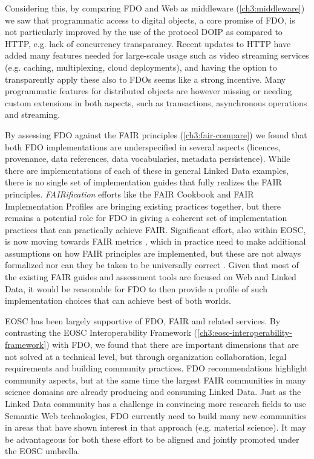 Considering this, by comparing FDO and Web as middleware (\vref*{ch3:middleware}) we saw that programmatic access to digital objects, a core promise of FDO, is not particularly improved by the use of the protocol DOIP as compared to HTTP, e.g. lack of concurrency transparancy. Recent updates to HTTP have added many features needed for large-scale usage such as video streaming services (e.g. caching, multiplexing, cloud deployments), and having the option to transparently apply these also to FDOs seems like a strong incentive. Many programmatic features for distributed objects are however missing or needing custom extensions in both aspects, such as transactions, asynchronous operations and streaming.

By assessing FDO against the FAIR principles (\vref*{ch3:fair-compare}) we found that both FDO implementations are underspecified in several aspects (licences, provenance, data references, data vocabularies, metadata persistence). While there are implementations of each of these in general Linked Data examples, there is no single set of implementation guides that fully realizes the FAIR principles. \emph{FAIRification} efforts like the FAIR Cookbook \cite{faircookbook} and FAIR Implementation Profiles \cite{FIP} are bringing existing practices together, but there remains a potential role for FDO in giving a coherent set of implementation practices that can practically achieve FAIR. Significant effort, also within EOSC, is now moving towards FAIR metrics \cite{Devaraju_2021}, which in practice need to make additional assumptions on how FAIR principles are implemented, but these are not always formalized \cite{10.5281/zenodo.7463421} nor can they be taken to be universally correct \cite{10.5281/zenodo.7848102}. Given that most of the existing FAIR guides and assessment tools are focused on Web and Linked Data, it would be reasonable for FDO to then provide a profile of such implementation choices that can achieve best of both worlds.

EOSC has been largely supportive of FDO, FAIR and related services. By contrasting the EOSC Interoperability Framework (\vref*{ch3:eosc-interoperability-framework}) with FDO, we found that there are important dimensions that are not solved at a technical level, but through organization collaboration, legal requirements and building community practices. FDO recommendations highlight community aspects, but at the same time the largest FAIR communities in many science domains are already producing and consuming Linked Data. Just as the Linked Data community has a challenge in convincing more research fields to use Semantic Web technologies, FDO currently need to build many new communities in areas that have shown interest in that approach (e.g. material science).  It may be advantageous for both these effort to be aligned and jointly promoted under the EOSC umbrella. 



